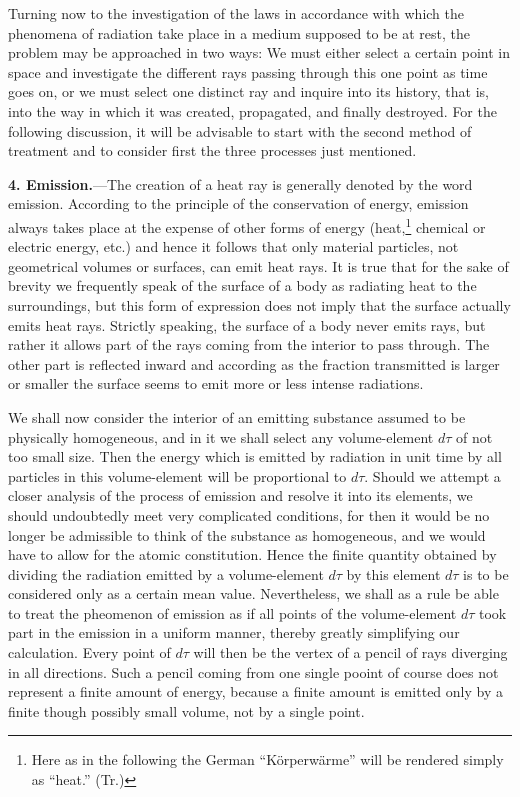 \documentclass[12pt,oneside]{book}
\begin{document}
Turning now to the investigation of the laws in accordance with which the phenomena of radiation take place in a medium supposed to be at rest, the problem may be approached in two ways: We must either select a certain point in space and investigate the different rays passing through this one point as time goes on, or we must select one distinct ray and inquire into its history, that is, into the way in which it was created, propagated, and finally destroyed. For the following discussion, it will be advisable to start with the second method of treatment and to consider first the three processes just mentioned. \par

\textbf{4. Emission.}---The creation of a heat ray is generally denoted by the word emission. According to the principle of the conservation of energy, emission always takes place at the expense of other forms of energy (heat,\footnote{Here as in the following the German ``K\"orperw\"arme'' will be rendered simply as ``heat.'' (Tr.)} chemical or electric energy, etc.) and hence it follows that only material particles, not geometrical volumes or surfaces, can emit heat rays. It is true that for the sake of brevity we frequently speak of the surface of a body as radiating heat to the surroundings, but this form of expression does not imply that the surface actually emits heat rays. Strictly speaking, the surface of a body never emits rays, but rather it allows part of the rays coming from the interior to pass through. The other part is reflected inward and according as the fraction transmitted is larger or smaller the surface seems to emit more or less intense radiations. \par

We shall now consider the interior of an emitting substance assumed to be physically homogeneous, and in it we shall select any volume-element $d\tau$ of not too small size. Then the energy which is emitted by radiation in unit time by all particles in this volume-element will be proportional to $d\tau$. Should we attempt a closer analysis of the process of emission and resolve it into its elements, we should undoubtedly meet very complicated conditions, for then it would be no longer be admissible to think of the substance as homogeneous, and we would have to allow for the atomic constitution. Hence the finite quantity obtained by dividing the radiation emitted by a volume-element $d\tau$ by this element $d\tau$ is to be considered only as a certain mean value. Nevertheless, we shall as a rule be able to treat the pheomenon of emission as if all points of the volume-element $d\tau$ took part in the emission in a uniform manner, thereby greatly simplifying our calculation. Every point of $d\tau$ will then be the vertex of a pencil of rays diverging in all directions. Such a pencil coming from one single pooint of course does not represent a finite amount of energy, because a finite amount is emitted only by a finite though possibly small volume, not by a single point. \par
\end{document}
